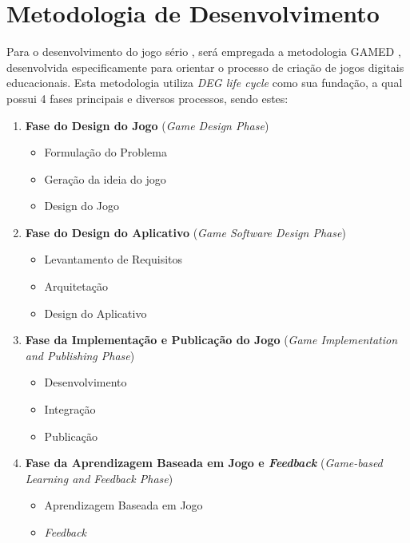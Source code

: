 \section{Metodologia de Desenvolvimento}

Para o desenvolvimento do jogo sério \cite{mouaheb2012serious}, será empregada a metodologia GAMED \cite{aslan2015gamed}, desenvolvida especificamente para orientar o processo de criação de jogos digitais educacionais. Esta metodologia utiliza \emph{DEG life cycle} como sua fundação, a qual possui 4 fases principais e diversos processos, sendo estes:

\begin{enumerate}
  \item \textbf{Fase do Design do Jogo} (\emph{Game Design Phase})
  \begin{itemize}
    \item Formulação do Problema
    \item Geração da ideia do jogo
    \item Design do Jogo
  \end{itemize}
  \item \textbf{Fase do Design do Aplicativo} (\emph{Game Software Design Phase})
  \begin{itemize}
    \item Levantamento de Requisitos
    \item Arquitetação
    \item Design do Aplicativo
  \end{itemize}
  \item \textbf{Fase da Implementação e Publicação do Jogo} (\emph{Game Implementation and Publishing Phase})
  \begin{itemize}
    \item Desenvolvimento
    \item Integração
    \item Publicação
  \end{itemize}
  \item \textbf{Fase da Aprendizagem Baseada em Jogo e \emph{Feedback}} (\emph{Game-based Learning and Feedback Phase})
  \begin{itemize}
    \item Aprendizagem Baseada em Jogo
    \item \emph{Feedback}
  \end{itemize}
\end{enumerate}



